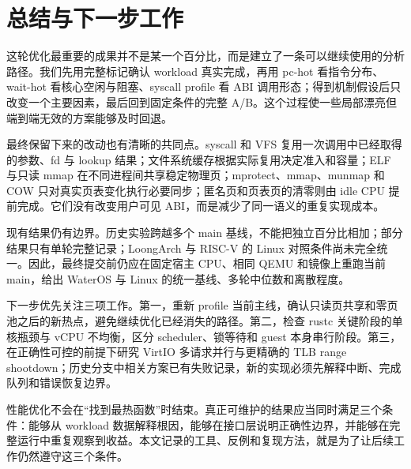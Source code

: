 \chapter{总结与下一步工作}

这轮优化最重要的成果并不是某一个百分比，而是建立了一条可以继续使用的分析路径。我们先用完整标记确认 workload 真实完成，再用 pc-hot 看指令分布、wait-hot 看核心空闲与阻塞、syscall profile 看 ABI 调用形态；得到机制假设后只改变一个主要因素，最后回到固定条件的完整 A/B。这个过程使一些局部漂亮但端到端无效的方案能够及时回退。

最终保留下来的改动也有清晰的共同点。syscall 和 VFS 复用一次调用中已经取得的参数、fd 与 lookup 结果；文件系统缓存根据实际复用决定准入和容量；ELF 与只读 mmap 在不同进程间共享稳定物理页；mprotect、mmap、munmap 和 COW 只对真实页表变化执行必要同步；匿名页和页表页的清零则由 idle CPU 提前完成。它们没有改变用户可见 ABI，而是减少了同一语义的重复实现成本。

现有结果仍有边界。历史实验跨越多个 main 基线，不能把独立百分比相加；部分结果只有单轮完整记录；LoongArch 与 RISC-V 的 Linux 对照条件尚未完全统一。因此，最终提交前仍应在固定宿主 CPU、相同 QEMU 和镜像上重跑当前 main，给出 WaterOS 与 Linux 的统一基线、多轮中位数和离散程度。

下一步优先关注三项工作。第一，重新 profile 当前主线，确认只读页共享和零页池之后的新热点，避免继续优化已经消失的路径。第二，检查 rustc 关键阶段的单核瓶颈与 vCPU 不均衡，区分 scheduler、锁等待和 guest 本身串行阶段。第三，在正确性可控的前提下研究 VirtIO 多请求并行与更精确的 TLB range shootdown；历史分支中相关方案已有失败记录，新的实现必须先解释中断、完成队列和错误恢复边界。

性能优化不会在“找到最热函数”时结束。真正可维护的结果应当同时满足三个条件：能够从 workload 数据解释根因，能够在接口层说明正确性边界，并能够在完整运行中重复观察到收益。本文记录的工具、反例和复现方法，就是为了让后续工作仍然遵守这三个条件。
